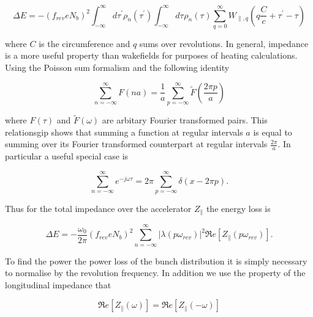 \documentclass{cernrep}
\begin{document}
\begin{equation}
\Delta E = - \left( f_{rev} e N_{b}\right)^{2} \int^{\infty}_{-\infty} d\tau^{'} \rho_{n} \left( \tau^{'} \right) \int^{\infty}_{-\infty} d\tau^{} \rho_{n} \left( \tau^{} \right) \displaystyle\sum\limits_{q = 0}^{\infty} W_{\parallel, q} \left( q\frac{C}{c} + \tau^{'} - \tau \right)  
\label{eqn:sum_wake_loss}
\end{equation}

where $C$ is the circumference and $q$ sums over revolutions. In general, impedance is a more useful property than wakefields for purposes of heating calculations. Using the Poisson sum formalism and the following identity

\begin{equation}
\displaystyle\sum\limits_{n = -\infty}^{\infty} F \left( n a \right) = \frac{1}{a} \displaystyle\sum\limits_{p = -\infty}^{\infty} \tilde{F} \left( \frac{2\pi p}{a} \right)
\end{equation}

where $F(\tau)$ and $\tilde{F}(\omega)$ are arbitary Fourier transformed pairs. This relationsgip shows that summing a function at regular intervals $a$ is equal to summing over its Fourier transformed counterpart at regular intervals $\frac{2 \pi}{a}$. In particular a useful special case is

\begin{equation}
\displaystyle\sum\limits_{n = -\infty}^{\infty} e^{-j\omega \tau} = 2\pi \displaystyle\sum\limits_{p = -\infty}^{\infty} \delta \left( x - 2\pi p \right).
\end{equation}

Thus for the total impedance over the accelerator $Z_{\parallel}$ the energy loss is

\begin{equation}
\Delta E = -\frac{\omega_{0}}{2\pi} \left( f_{rev} e N_{b}\right)^{2} \displaystyle\sum\limits_{n = -\infty}^{\infty}  \left| \lambda \left( p \omega_{rev} \right)  \right|^{2} \Re{}e \left[ Z_{\parallel} \left( p \omega_{rev} \right) \right].
\end{equation}

To find the power the power loss of the bunch distribution it is simply necessary to normalise by the revolution frequency. In addition we use the property of the longitudinal impedance that 

\begin{equation}
\Re{}e \left[ Z_{\parallel} \left( \omega \right) \right] =  \Re{}e \left[ Z_{\parallel} \left( -\omega \right) \right]
\end{equation}
\end{document}
